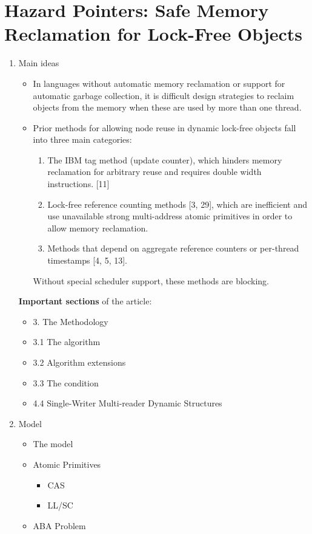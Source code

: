 \documentclass[openany, a4paper]{book}
\theoremstyle{break}
\theoremstyle{example}
\theoremstyle{note}
\theoremstyle{break}
\theoremstyle{exercise}
\begin{document}
\section{Hazard Pointers: Safe Memory Reclamation for Lock-Free Objects}
\label{sec:orgab111a1}
\begin{enumerate}
\item Main ideas
\label{sec:org5a56137}

\begin{itemize}
\item In languages without automatic memory reclamation or support for
automatic garbage collection, it is difficult design strategies to
reclaim objects from the memory when these are used by more than one
thread.
\item Prior methods for allowing node reuse in dynamic lock-free objects fall
into three main categories:
\begin{enumerate}
\item The IBM tag method (update counter), which hinders memory reclamation
for arbitrary reuse and requires double width instructions. [11]
\item Lock-free reference counting methods [3, 29], which are inefficient
and use unavailable strong multi-address atomic primitives in order to
allow memory reclamation.
\item Methods that depend on aggregate reference counters or per-thread
timestamps [4, 5, 13].
\end{enumerate}
Without special scheduler support, these methods are blocking.
\end{itemize}

\textbf{Important sections} of the article:

\begin{itemize}
\item 3. The Methodology
\item 3.1 The algorithm
\item 3.2 Algorithm extensions
\item 3.3 The condition
\item 4.4 Single-Writer Multi-reader Dynamic Structures
\end{itemize}

\item Model
\label{sec:org7ee2e97}

\begin{itemize}
\item The model
\item Atomic Primitives
\begin{itemize}
\item CAS
\item LL/SC
\end{itemize}
\item ABA Problem
\end{itemize}


\end{enumerate}
\end{document}

